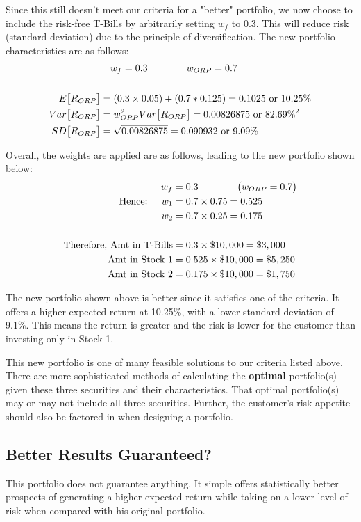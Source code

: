 \documentclass[12pt]{article}
\begin{document}
Since this still doesn't meet our criteria for a "better" portfolio, we now choose to include the risk-free T-Bills by arbitrarily setting $w_f$ to 0.3. This will reduce risk (standard deviation) due to the principle of diversification. The new portfolio characteristics are as follows:
\begin{align*}
	&\text{\quad} w_f = 0.3 \text{\qquad\qquad} w_{ORP} = 0.7\\
	&\\
	E\big[R_{ORP}\big] &= (0.3\times0.05) + (0.7*0.125) = 0.1025 \text{ or }10.25\%\\
	Var\big[R_{ORP}\big] &= w_{ORP}^2Var\big[R_{ORP}\big] = 0.00826875 \text{ or } 82.69\%^2\\
	SD\big[R_{ORP}\big] &= \sqrt{0.00826875} = 0.090932 \text { or } 9.09\%
\end{align*}

Overall, the weights are applied are as follows, leading to the new portfolio shown below:
\begin{align*}
	w_f &= 0.3 \text{\qquad\qquad} \big(w_{ORP} = 0.7\big)\\
	\text{Hence: \quad} w_1 &= 0.7\times0.75 = 0.525\\
	w_2 &= 0.7\times0.25 = 0.175\\
	&\\
	\text{Therefore, Amt in T-Bills} &= 0.3 \times \$10,000 = \$3,000\\
	\text{Amt in Stock 1} &= 0.525 \times \$10,000 = \$5,250\\
	\text{Amt in Stock 2} &= 0.175 \times \$10,000 = \$1,750
\end{align*}

The new portfolio shown above is better since it satisfies one of the criteria. It offers a higher expected return at 10.25\%, with a lower standard deviation of 9.1\%. This means the return is greater and the risk is lower for the customer than investing only in Stock 1.

This new portfolio is one of many feasible solutions to our criteria listed above. There are more sophisticated methods of calculating the \textbf{optimal} portfolio(s) given these three securities and their characteristics. That optimal portfolio(s) may or may not include all three securities. Further, the customer's risk appetite should also be factored in when designing a portfolio.

\subsection{Better Results Guaranteed?}
This portfolio does not guarantee anything. It simple offers statistically better prospects of generating a higher expected return while taking on a lower level of risk when compared with his original portfolio. 
\end{document}
